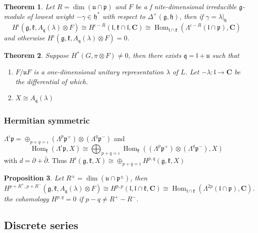 \documentclass[leqno]{amsart}
\newcommand{\C}{\mathbf C}
\newcommand{\1}{\mathbf{1}}
\newcommand{\cfg}{\mathfrak{g}}
\newcommand{\cfh}{\mathfrak{h}}
\newcommand{\cfk}{\mathfrak{k}}
\newcommand{\cfp}{\mathfrak{p}}
\newcommand{\cfq}{\mathfrak{q}}
\newcommand{\cfu}{\mathfrak{u}}
\newcommand{\cfl}{\mathfrak{l}}
\DeclareMathOperator{\Hom}{Hom}
\newtheorem{thm}{Theorem}[section]
\newtheorem{prop}[thm]{Proposition}
\theoremstyle{definition}
\theoremstyle{remark}
\begin{document}
\begin{thm}
	Let $R=\dim(\cfu\cap\cfp)$
	and $F$ be a f nite-dimensional irreducible $\cfg$-module
	of lowest weight $-\gamma\in \cfh^*$
	with respect to  $\Delta^+(\cfg,\cfh)$,
	then if $\gamma=\lambda\vert_{\cfh}$
	\[
		H^\iota(\cfg,\cfk,A_\cfq(\lambda)\otimes F)\cong
		H^{\iota-R}(\cfl,\cfk\cap\cfl,\C)\cong
		\Hom_{\cfl\cap\cfk}
		(\Lambda^{\iota-R}(\cfl\cap\cfp), \C)
	\]
	and otherwise
	$H^\iota(\cfg,\cfk,A_\cfq(\lambda)\otimes F)=0$.
\end{thm}

\begin{thm}
	Suppose $H^*(G,\pi\otimes F)\neq 0$,
	then there exists  $\cfq=\cfl+\cfu$ such that
	 \begin{enumerate}[label=(\alph*)]
		\item $F/\cfu F$ is a one-dimensional 
			unitary representation $\lambda$ of $L$.
			Let $-\lambda\colon \cfl\to \C$
			be the differential of which.
		\item  $X\cong A_\cfq(\lambda)$
	\end{enumerate}
\end{thm}

\subsubsection{Hermitian symmetric}

$\Lambda^\iota\cfp=\oplus_{p+q=\iota}(\Lambda^p\cfp^+)
\otimes(\Lambda^q\cfp^-)$ and
\[
	\Hom_\cfk(\Lambda^\iota\cfp,X)\cong
	\bigoplus_{p+q=\iota}
	\Hom_\cfk((\Lambda^p\cfp^+) \otimes(\Lambda^q\cfp^-),X)
\]
with $d=\partial+\bar{\partial}$.
Thus 
$H^i(\cfg,\cfk,X)\cong \oplus_{p+q=i}H^{p,q}(\cfg,\cfk,X)$

\begin{prop}
	Let $R^{\pm}=\dim(\cfu\cap\cfp^\pm)$, 
	then
	\[
		H^{p+R^+,p+R^-}(\cfg,\cfk,A_\cfq(\lambda)\otimes F)
		\cong H^{p,p}(\cfl,\cfl\cap\cfk,\C)
		\cong \Hom_{\cfl\cap\cfk}
		(\Lambda^{2p}(\cfl\cap\cfp),\C).
	\]
	the cohomology $H^{p,q}=0$ 
	if $p-q\neq R^+-R^-$.
\end{prop}


\subsection{Discrete series}
\end{document}
